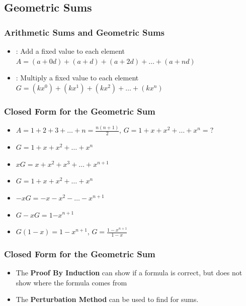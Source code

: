 \documentclass{beamer}
\begin{document}
\subsection{Geometric Sums}

\begin{frame}
  \frametitle{Arithmetic Sums and Geometric Sums}

  {\larger

    \begin{itemize}
    \item {}: Add a fixed value to each element\\
      $A = (a+0d) + (a+d) + (a+2d) + \ldots + (a+nd)$

      \bigskip

    \item {}: Multiply a fixed value to each element\\
      $G = (kx^0) + (kx^1) + (kx^2) + \ldots + (kx^n)$
    \end{itemize}
    
  }
  
\end{frame}

\begin{frame}
  \frametitle{Closed Form for the Geometric Sum}

  {\larger
    \begin{itemize}
    \item $A = 1 + 2 + 3 + \ldots + n = \frac{n(n+1)}{2}$, $G = 1 + x + x^2 + \ldots + x^n = ?$

      \bigskip

    \item<2-> $G = 1 + x + x^2 + \ldots + x^n$
    \item<2-> $xG = x + x^2 + x^3 + \ldots + x^{n+1}$

      \bigskip

    \item<3-> $G = 1 + x + x^2 + \ldots + x^n$ 
    \item<3-> $-xG = - x - x^2 - \ldots - x^{n+1}$
      
    \item<3-> $G-xG = 1 $\hspace{2cm}$-x^{n+1}$
    \item<3-> $G(1-x) = 1 - x^{n+1}$, $G = \frac{1-x^{n+1}}{1-x}$      
    \end{itemize}
  }
\end{frame}

\begin{frame}
  \frametitle{Closed Form for the Geometric Sum}

  {\larger
    \begin{itemize}
    \item The {\bf Proof By Induction} can show if a formula is
      correct, but does not show \alert{where the formula comes from}

      \bigskip

    \item The {\bf Perturbation Method} can be used to find
       for sums.
    \end{itemize}
  }
\end{frame}
\end{document}

